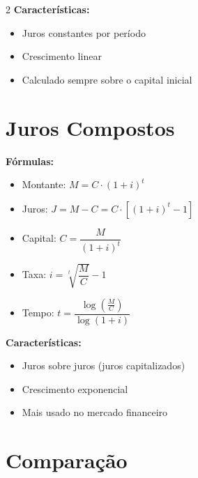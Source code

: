 \documentclass[11pt]{article}
\begin{document}
\begin{multicols}{2}
\textbf{Características:}
\begin{itemize}
\item Juros constantes por período
\item Crescimento linear
\item Calculado sempre sobre o capital inicial
\end{itemize}

\section*{Juros Compostos}


\textbf{Fórmulas:}
\begin{itemize}
\item Montante: $M = C \cdot (1 + i)^t$
\item Juros: $J = M - C = C \cdot [(1 + i)^t - 1]$
\item Capital: $C = \dfrac{M}{(1 + i)^t}$
\item Taxa: $i = \sqrt[t]{\dfrac{M}{C}} - 1$
\item Tempo: $t = \dfrac{\log\left(\frac{M}{C}\right)}{\log(1 + i)}$
\end{itemize}

\textbf{Características:}
\begin{itemize}
\item Juros sobre juros (juros capitalizados)
\item Crescimento exponencial
\item Mais usado no mercado financeiro
\end{itemize}

\section*{Comparação}

\begin{center}
\end{center}


\end{multicols}
\end{document}
